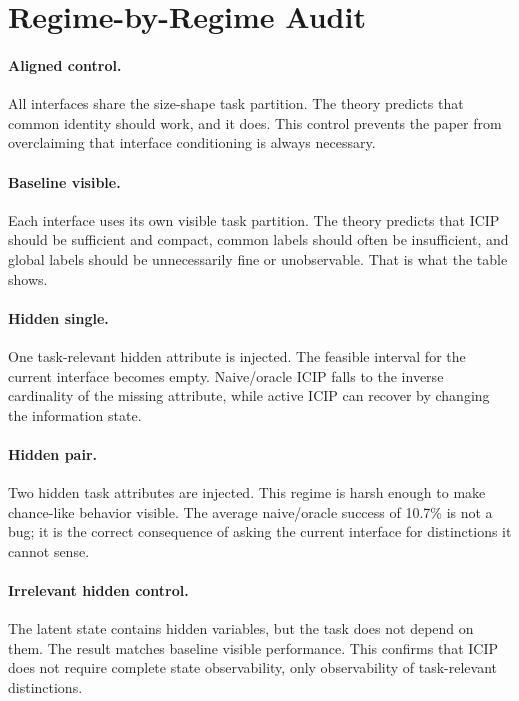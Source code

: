 \documentclass{article}
\newcommand{\icip}{\textsc{ICIP}}
\begin{document}
\section{Regime-by-Regime Audit}

\paragraph{Aligned control.}
All interfaces share the size-shape task partition.
The theory predicts that common identity should work, and it does.
This control prevents the paper from overclaiming that interface conditioning is always necessary.

\paragraph{Baseline visible.}
Each interface uses its own visible task partition.
The theory predicts that \icip{} should be sufficient and compact, common labels should often be insufficient, and global labels should be unnecessarily fine or unobservable.
That is what the table shows.

\paragraph{Hidden single.}
One task-relevant hidden attribute is injected.
The feasible interval for the current interface becomes empty.
Naive/oracle \icip{} falls to the inverse cardinality of the missing attribute, while active \icip{} can recover by changing the information state.

\paragraph{Hidden pair.}
Two hidden task attributes are injected.
This regime is harsh enough to make chance-like behavior visible.
The average naive/oracle success of 10.7\% is not a bug; it is the correct consequence of asking the current interface for distinctions it cannot sense.

\paragraph{Irrelevant hidden control.}
The latent state contains hidden variables, but the task does not depend on them.
The result matches baseline visible performance.
This confirms that \icip{} does not require complete state observability, only observability of task-relevant distinctions.
\end{document}
